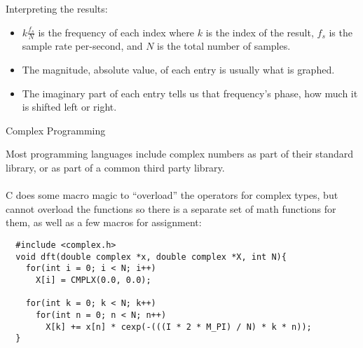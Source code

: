 \documentclass{beamer}
\begin{document}
\begin{frame}
  Interpreting the results:
  \begin{itemize}
    \item $k\frac{f_s}{N}$ is the frequency of each index where $k$ is the index of the result, $f_s$ is the sample rate per-second, and $N$ is the total number of samples.
    \item The magnitude, absolute value, of each entry is usually what is graphed.
    \item The imaginary part of each entry tells us that frequency's phase, how much it is shifted left or right.
  \end{itemize}
\end{frame}

\begin{frame}[fragile]{Complex Programming}

  Most programming languages include complex numbers as part of their standard library, or as part of a common third party library.\\~\\
  C does some macro magic to ``overload'' the operators for complex types, but cannot overload the functions so there is a separate set of math functions for them, as well as a few macros for assignment:
  \begin{lstlisting}
  #include <complex.h>
  void dft(double complex *x, double complex *X, int N){
    for(int i = 0; i < N; i++)
      X[i] = CMPLX(0.0, 0.0);

    for(int k = 0; k < N; k++)
      for(int n = 0; n < N; n++)
        X[k] += x[n] * cexp(-(((I * 2 * M_PI) / N) * k * n));
  }
\end{lstlisting}
\end{frame}
\end{document}
